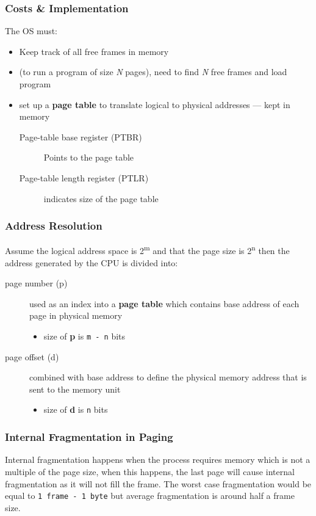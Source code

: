 \documentclass{article}%
\begin{document}
\subsubsection{Costs \& Implementation}
\label{sec:org99ea956}
The OS must:
\begin{itemize}
\item Keep track of all free frames in memory
\item (to run a program of size \emph{N} pages), need to find \emph{N} free frames and load program
\item set up a \textbf{page table} to translate logical to physical addresses --- kept in memory
\begin{description}
\item[{Page-table base register (PTBR)}] Points to the page table
\item[{Page-table length register (PTLR)}] indicates size of the page table
\end{description}
\end{itemize}
\subsubsection{Address Resolution}
\label{sec:org3cc3f0f}
Assume the logical address space is 2\textsuperscript{m} and that the page size is 2\textsuperscript{n} then the address generated by the CPU is divided into:
\begin{description}
\item[{page number (p)}] used as an index into a \textbf{page table} which contains base address of each page in physical memory
\begin{itemize}
\item size of \textbf{p} is \texttt{m - n} bits
\end{itemize}
\item[{page offset (d)}] combined with base address to define the physical memory address that is sent to the memory unit
\begin{itemize}
\item size of \textbf{d} is \texttt{n} bits
\end{itemize}
\end{description}
\subsubsection{Internal Fragmentation in Paging}
\label{sec:org56d6de9}
Internal fragmentation happens when the process requires memory which is not a multiple of the page size, when this happens, the last page will cause internal fragmentation as it will not fill the frame.
The worst case fragmentation would be equal to \texttt{1 frame - 1 byte} but average fragmentation is around half a frame size.
\end{document}
